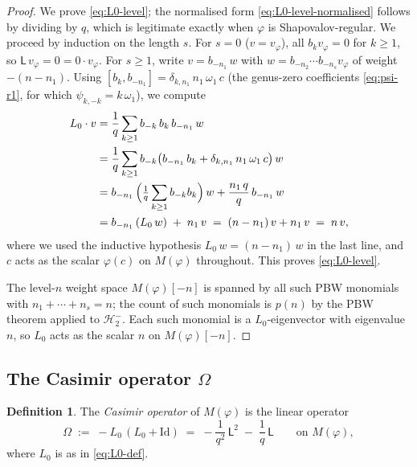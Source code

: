 \documentclass[12pt]{amsart}
\theoremstyle{plain}
\theoremstyle{definition}
\newtheorem{definition}[theorem]{Definition}
\newcommand{\Lalg}{{\mathsf{L}}}
\newcommand{\Mf}{M(\varphi)}          %
\newcommand{\vf}{v_\varphi}           %
\newcommand{\Om}{\Omega}              %
\begin{document}
\begin{proof}
We prove \eqref{eq:L0-level}; the normalised form
\eqref{eq:L0-level-normalised} follows by dividing by $q$, which is
legitimate exactly when $\varphi$ is Shapovalov-regular.
We proceed by induction on the length $s$.
For $s=0$ ($v=\vf$), all $b_k\vf = 0$ for $k\geq 1$, so $\Lalg\,\vf = 0
= 0\cdot\vf$.
For $s\geq 1$, write $v = b_{-n_1}\,w$ with $w = b_{-n_2}\cdots b_{-n_s}\vf$
of weight $-(n-n_1)$. Using
$[b_k,b_{-n_1}] = \delta_{k,n_1}\,n_1\,\omega_1\,c$
(the genus-zero coefficients \eqref{eq:psi-r1}, for which
$\psi_{k,-k} = k\,\omega_1$), we compute
\begin{align*}
  L_0 \cdot v
  &= \frac{1}{q}
     \sum_{k\geq 1} b_{-k}\,b_k\,b_{-n_1}\,w \\
  &= \frac{1}{q}
     \sum_{k\geq 1} b_{-k}
       \bigl(b_{-n_1}\,b_k + \delta_{k,n_1}\,n_1\,\omega_1\,c\bigr)\,w \\
  &= b_{-n_1}\,\Bigl(\tfrac{1}{q}\sum_{k\geq 1}b_{-k}b_k\Bigr)\,w
     + \frac{n_1\,q}{q}\,b_{-n_1}\,w \\
  &= b_{-n_1}\,(L_0\,w) \;+\; n_1\,v
   \;=\; (n - n_1)\,v + n_1\,v \;=\; n\,v,
\end{align*}
where we used the inductive hypothesis $L_0\,w = (n-n_1)\,w$ in the last
line, and $c$ acts as the scalar $\varphi(c)$ on $\Mf$ throughout.
This proves \eqref{eq:L0-level}.

The level-$n$ weight space $\Mf[-n]$ is spanned by all such PBW monomials
with $n_1+\cdots+n_s = n$; the count of such monomials is $p(n)$ by the
PBW theorem applied to $\mathcal{H}_2^-$. Each such monomial is a
$L_0$-eigenvector with eigenvalue $n$, so $L_0$ acts as the scalar $n$
on $\Mf[-n]$.
\end{proof}

\subsection{The Casimir operator $\Om$}
\label{subsec:casimir-element}

\begin{definition}
\label{def:casimir}
The \emph{Casimir operator} of $\Mf$ is the linear operator
\begin{equation}\label{eq:Omega-def}
  \Om \;:=\; -L_0\,(L_0+\mathrm{Id})
       \;=\; -\frac{1}{q^2}\,\Lalg^2 \;-\; \frac{1}{q}\,\Lalg
  \qquad\text{on } \Mf,
\end{equation}
where $L_0$ is as in \eqref{eq:L0-def}.
\end{definition}
\end{document}
